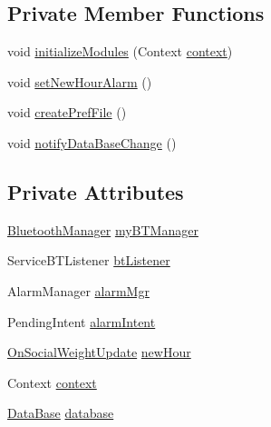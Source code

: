 \subsection*{Private Member Functions}
\begin{DoxyCompactItemize}
\item 
void \hyperlink{classcom_1_1copelabs_1_1oiframework_1_1socialproximity_1_1_social_proximity_a65c123bb947e5869356221bdcd9903bf}{initialize\+Modules} (Context \hyperlink{classcom_1_1copelabs_1_1oiframework_1_1socialproximity_1_1_social_proximity_ada103a1960c6dea378ae77ffefe7d8ea}{context})
\item 
void \hyperlink{classcom_1_1copelabs_1_1oiframework_1_1socialproximity_1_1_social_proximity_a24ed99fede3518f6b3262ad71812628e}{set\+New\+Hour\+Alarm} ()
\item 
void \hyperlink{classcom_1_1copelabs_1_1oiframework_1_1socialproximity_1_1_social_proximity_a08ad58df59e50dc6334902ac0a83582f}{create\+Pref\+File} ()
\item 
void \hyperlink{classcom_1_1copelabs_1_1oiframework_1_1socialproximity_1_1_social_proximity_a5826237684a54558e7652432ffbc9a1c}{notify\+Data\+Base\+Change} ()
\end{DoxyCompactItemize}
\subsection*{Private Attributes}
\begin{DoxyCompactItemize}
\item 
\hyperlink{classcom_1_1copelabs_1_1oiframework_1_1bt_1_1_bluetooth_manager}{Bluetooth\+Manager} \hyperlink{classcom_1_1copelabs_1_1oiframework_1_1socialproximity_1_1_social_proximity_a97e98caf9eac0a2361d325427166fb76}{my\+B\+T\+Manager}
\item 
Service\+B\+T\+Listener \hyperlink{classcom_1_1copelabs_1_1oiframework_1_1socialproximity_1_1_social_proximity_ad5f4a3189c652670dfdd14154126a264}{bt\+Listener}
\item 
Alarm\+Manager \hyperlink{classcom_1_1copelabs_1_1oiframework_1_1socialproximity_1_1_social_proximity_a950c783d8374674069f7c822288bdd03}{alarm\+Mgr}
\item 
Pending\+Intent \hyperlink{classcom_1_1copelabs_1_1oiframework_1_1socialproximity_1_1_social_proximity_a0b5c8cb5d48f631c7b9cca9cbb2935ef}{alarm\+Intent}
\item 
\hyperlink{classcom_1_1copelabs_1_1oiframework_1_1socialproximity_1_1_on_social_weight_update}{On\+Social\+Weight\+Update} \hyperlink{classcom_1_1copelabs_1_1oiframework_1_1socialproximity_1_1_social_proximity_aa4bff9fdacc2c0972cb658bdd969b696}{new\+Hour}
\item 
Context \hyperlink{classcom_1_1copelabs_1_1oiframework_1_1socialproximity_1_1_social_proximity_ada103a1960c6dea378ae77ffefe7d8ea}{context}
\item 
\hyperlink{classcom_1_1copelabs_1_1oiframework_1_1socialproximity_1_1_data_base}{Data\+Base} \hyperlink{classcom_1_1copelabs_1_1oiframework_1_1socialproximity_1_1_social_proximity_a025e9776b63c2be20a62dd41bb1d1b75}{database}
\end{DoxyCompactItemize}
